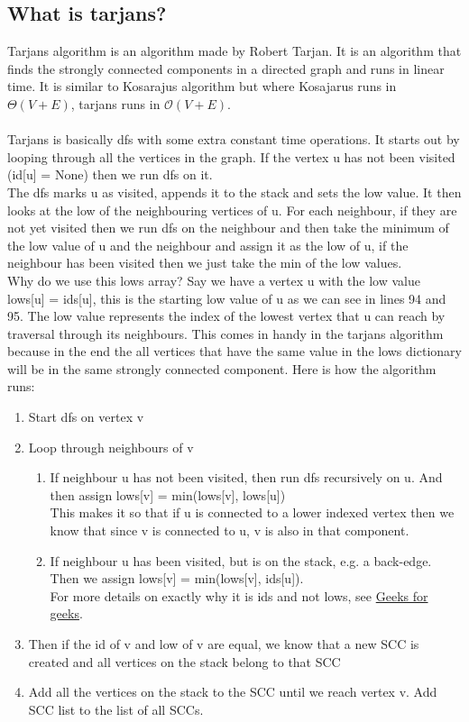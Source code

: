 \documentclass{article}
\begin{document}
\subsection{What is tarjans?}
Tarjans algorithm is an algorithm made by Robert Tarjan. It is an algorithm that finds the strongly connected components in a directed graph and runs in linear time. It is similar to Kosarajus algorithm but where Kosajarus runs in $\Theta(V+E)$, tarjans runs in $\mathcal{O}(V+E)$. \\ \\
Tarjans is basically dfs with some extra constant time operations. It starts out by looping through all the vertices in the graph. If the vertex u has not been visited (id[u] = None) then we run dfs on it.\\
The dfs marks u as visited, appends it to the stack and sets the low value. It then looks at the low of the neighbouring vertices of u. For each neighbour, if they are not yet visited then we run dfs on the neighbour and then take the minimum of the low value of u and the neighbour and assign it as the low of u, if the neighbour has been visited then we just take the min of the low values. \\
Why do we use this lows array? Say we have a vertex u with the low value lows[u] = ids[u], this is the starting low value of u as we can see in lines 94 and 95. The low value represents the index of the lowest vertex that u can reach by traversal through its neighbours. This comes in handy in the tarjans algorithm because in the end the all vertices that have the same value in the lows dictionary will be in the same strongly connected component. Here is how the algorithm runs:
\begin{enumerate}
    \item Start dfs on vertex v
    \item Loop through neighbours of v
    \begin{enumerate}
        \item If neighbour u has not been visited, then run dfs recursively on u. And then assign lows[v] = min(lows[v], lows[u]) \\
        This makes it so that if u is connected to a lower indexed vertex then we know that since v is connected to u, v is also in that component.
        \item If neighbour u has been visited, but is on the stack, e.g. a back-edge. Then we assign lows[v] = min(lows[v], ids[u]).\\
        For more details on exactly why it is ids and not lows, see \href{https://www.geeksforgeeks.org/tarjan-algorithm-find-strongly-connected-components/}{Geeks for geeks}.
    \end{enumerate}
    \item Then if the id of v and low of v are equal, we know that a new SCC is created and all vertices on the stack belong to that SCC
    \item Add all the vertices on the stack to the SCC until we reach vertex v. Add SCC list to the list of all SCCs.
\end{enumerate}
\end{document}
